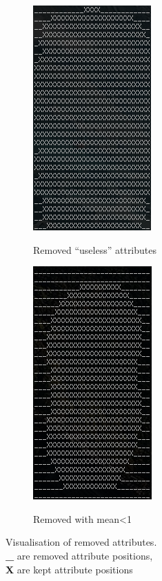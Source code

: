 \documentclass[10pt]{article}
\begin{document}
      \begin{figure}
        \centering

        \begin{subfigure}[t]{.5\textwidth}
          \centering
            \caption{Removed ``useless'' attributes}
            \includegraphics[scale=1]{visualisedRemoveUnused.png}
          \label{fig:visualisedRemoveUnused}
        \end{subfigure}%
        \begin{subfigure}[t]{.5\textwidth}
          \centering
            \caption{Removed with mean\textless1}
            \includegraphics[scale=1]{visualisedMeanRemoval.png}
          \label{fig:visualisedRemoveMean}
        \end{subfigure}

        \caption{Visualisation of removed attributes.\\\textbf{\_} are removed attribute positions,\\\textbf{X} are kept attribute positions}
        \label{fig:visualisedRemove}
      \end{figure}
\end{document}
